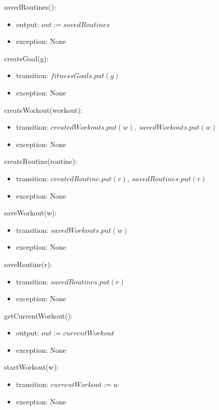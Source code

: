 \documentclass[12pt, titlepage]{article}
\begin{document}
\noindent savedRoutines():
\begin{itemize}
	\item output: $out := savedRoutines$
	\item exception: None
\end{itemize}

\noindent createGoal(g):
\begin{itemize}
	\item transition: $ fitnessGoals.put(g) $
	\item exception: None
\end{itemize}

\noindent createWorkout(workout):
\begin{itemize}
	\item transition: $ createdWorkouts.put(w), \ savedWorkouts.put(w) $
	\item exception: None
\end{itemize}

\noindent createRoutine(routine):
\begin{itemize}
	\item transition: $ createdRoutine.put(r), \ savedRoutines.put(r) $
	\item exception: None
\end{itemize}

\noindent saveWorkout(w):
\begin{itemize}
	\item transition: $ savedWorkouts.put(w) $
	\item exception: None
\end{itemize}

\noindent saveRoutine(r):
\begin{itemize}
	\item transition: $ savedRoutines.put(r) $
	\item exception: None
\end{itemize}

\noindent getCurrentWorkout():
\begin{itemize}
	\item output: $out := currentWorkout$
	\item exception: None
\end{itemize}

\noindent startWorkout(w):
\begin{itemize}
	\item transition: $ currentWorkout := w $
	\item exception: None
\end{itemize}
\end{document}
